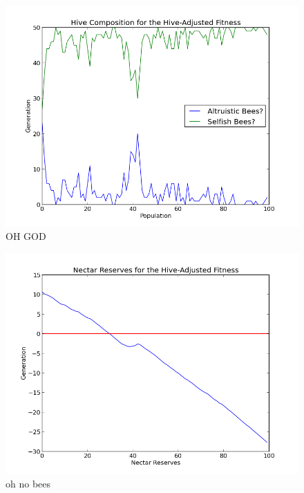 \documentclass[11pt]{article}
\begin{document}
			\begin{figure}[tb]
				\begin{center}
					\includegraphics[scale=.5]{results/hive_fitness_comp.png}
				\end{center}
				\caption{OH GOD}
				\label{fig:hive_fitness_composition}
			\end{figure}

			\begin{figure}[tb]
				\begin{center}
					\includegraphics[scale=.5]{results/hive_fitness_res.png}
				\end{center}
				\caption{oh no bees}
				\label{fig:hive_fitness_reserves}
			\end{figure}
\end{document}
